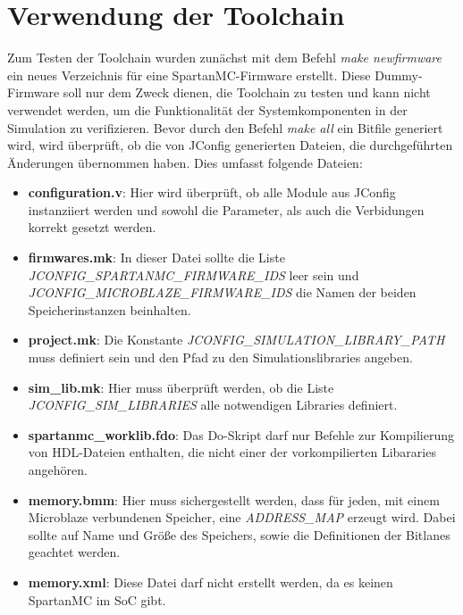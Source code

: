 \section{Verwendung der Toolchain} \label{sec:toolChainUsage}
Zum Testen der Toolchain wurden zunächst mit dem Befehl \textit{make newfirmware} ein neues Verzeichnis für eine SpartanMC-Firmware erstellt. Diese Dummy-Firmware soll nur dem Zweck dienen, die Toolchain zu testen und kann nicht verwendet werden, um die Funktionalität der Systemkomponenten in der Simulation zu verifizieren. Bevor durch den Befehl \textit{make all} ein Bitfile generiert wird, wird überprüft, ob die von JConfig generierten Dateien, die durchgeführten Änderungen übernommen haben. Dies umfasst folgende Dateien:
\begin{itemize}
	\item \textbf{configuration.v}: Hier wird überprüft, ob alle Module aus JConfig instanziiert werden und sowohl die Parameter, als auch die Verbidungen korrekt gesetzt werden.
	\item \textbf{firmwares.mk}: In dieser Datei sollte die Liste \textit{JCONFIG\_SPARTANMC\_FIRMWARE\_IDS} leer sein und \textit{JCONFIG\_MICROBLAZE\_FIRMWARE\_IDS} die Namen der beiden Speicherinstanzen beinhalten.
	\item \textbf{project.mk}: Die Konstante \textit{JCONFIG\_SIMULATION\_LIBRARY\_PATH} muss definiert sein und den Pfad zu den Simulationslibraries angeben.
	\item \textbf{sim\_lib.mk}: Hier muss überprüft werden, ob die Liste \textit{JCONFIG\_SIM\_LIBRARIES} alle notwendigen Libraries definiert.
	\item \textbf{spartanmc\_worklib.fdo}: Das Do-Skript darf nur Befehle zur Kompilierung von HDL-Dateien enthalten, die nicht einer der vorkompilierten Libararies angehören.
	\item \textbf{memory.bmm}: Hier muss sichergestellt werden, dass für jeden, mit einem Microblaze verbundenen Speicher, eine \textit{ADDRESS\_MAP} erzeugt wird. Dabei sollte auf Name und Größe des Speichers, sowie die Definitionen der Bitlanes geachtet werden.
	\item \textbf{memory.xml}: Diese Datei darf nicht erstellt werden, da es keinen SpartanMC im SoC gibt.
\end{itemize}
